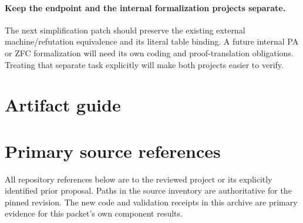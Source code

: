 \documentclass[11pt,letterpaper]{article}
\begin{document}
\paragraph{Keep the endpoint and the internal formalization projects separate.}
The next simplification patch should preserve the existing external machine/refutation
equivalence and its literal table binding. A future internal PA or ZFC formalization
will need its own coding and proof-translation obligations. Treating that separate task
explicitly will make both projects easier to verify.

\appendix
\section{Artifact guide}



\section{Primary source references}

All repository references below are to the reviewed project or its explicitly
identified prior proposal. Paths in the source inventory are authoritative for the
pinned revision. The new code and validation receipts in this archive are primary
evidence for this packet's own component results.
\end{document}
